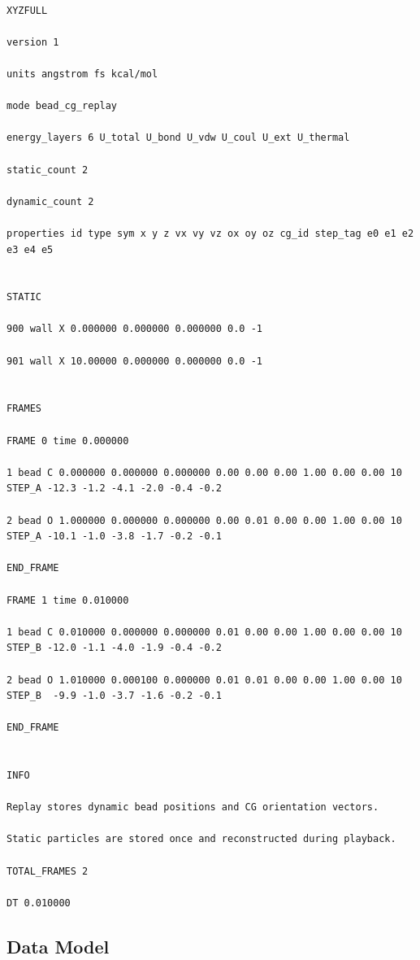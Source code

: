 \documentclass[12pt, a4paper, oneside]{article}
\begin{document}
\begin{lstlisting}[language={},frame=single]

XYZFULL

version 1

units angstrom fs kcal/mol

mode bead_cg_replay

energy_layers 6 U_total U_bond U_vdw U_coul U_ext U_thermal

static_count 2

dynamic_count 2

properties id type sym x y z vx vy vz ox oy oz cg_id step_tag e0 e1 e2 e3 e4 e5


STATIC

900 wall X 0.000000 0.000000 0.000000 0.0 -1

901 wall X 10.00000 0.000000 0.000000 0.0 -1


FRAMES

FRAME 0 time 0.000000

1 bead C 0.000000 0.000000 0.000000 0.00 0.00 0.00 1.00 0.00 0.00 10 STEP_A -12.3 -1.2 -4.1 -2.0 -0.4 -0.2

2 bead O 1.000000 0.000000 0.000000 0.00 0.01 0.00 0.00 1.00 0.00 10 STEP_A -10.1 -1.0 -3.8 -1.7 -0.2 -0.1

END_FRAME

FRAME 1 time 0.010000

1 bead C 0.010000 0.000000 0.000000 0.01 0.00 0.00 1.00 0.00 0.00 10 STEP_B -12.0 -1.1 -4.0 -1.9 -0.4 -0.2

2 bead O 1.010000 0.000100 0.000000 0.01 0.01 0.00 0.00 1.00 0.00 10 STEP_B  -9.9 -1.0 -3.7 -1.6 -0.2 -0.1

END_FRAME


INFO

Replay stores dynamic bead positions and CG orientation vectors.

Static particles are stored once and reconstructed during playback.

TOTAL_FRAMES 2

DT 0.010000

\end{lstlisting}


\subsection{Data Model}
\end{document}
